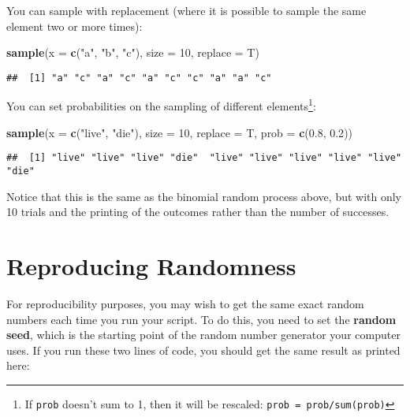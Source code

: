 \documentclass[]{book}
\newenvironment{Shaded}{\begin{snugshade}}{\end{snugshade}}
\newcommand{\DataTypeTok}[1]{\textcolor[rgb]{0.13,0.29,0.53}{#1}}
\newcommand{\DecValTok}[1]{\textcolor[rgb]{0.00,0.00,0.81}{#1}}
\newcommand{\FloatTok}[1]{\textcolor[rgb]{0.00,0.00,0.81}{#1}}
\newcommand{\KeywordTok}[1]{\textcolor[rgb]{0.13,0.29,0.53}{\textbf{#1}}}
\newcommand{\NormalTok}[1]{#1}
\newcommand{\StringTok}[1]{\textcolor[rgb]{0.31,0.60,0.02}{#1}}
\let\rmarkdownfootnote\footnote%
\def\footnote{\protect\rmarkdownfootnote}
\begin{document}
You can sample with replacement (where it is possible to sample the same element two or more times):

\begin{Shaded}
\begin{Highlighting}[]
\KeywordTok{sample}\NormalTok{(}\DataTypeTok{x =} \KeywordTok{c}\NormalTok{(}\StringTok{"a"}\NormalTok{, }\StringTok{"b"}\NormalTok{, }\StringTok{"c"}\NormalTok{), }\DataTypeTok{size =} \DecValTok{10}\NormalTok{, }\DataTypeTok{replace =}\NormalTok{ T)}
\end{Highlighting}
\end{Shaded}

\begin{verbatim}
##  [1] "a" "c" "a" "c" "a" "c" "c" "a" "a" "c"
\end{verbatim}

You can set probabilities on the sampling of different elements\footnote{If \texttt{prob} doesn't sum to 1, then it will be rescaled: \texttt{prob\ =\ prob/sum(prob)}}:

\begin{Shaded}
\begin{Highlighting}[]
\KeywordTok{sample}\NormalTok{(}\DataTypeTok{x =} \KeywordTok{c}\NormalTok{(}\StringTok{"live"}\NormalTok{, }\StringTok{"die"}\NormalTok{), }\DataTypeTok{size =} \DecValTok{10}\NormalTok{, }\DataTypeTok{replace =}\NormalTok{ T,}
       \DataTypeTok{prob =} \KeywordTok{c}\NormalTok{(}\FloatTok{0.8}\NormalTok{, }\FloatTok{0.2}\NormalTok{))}
\end{Highlighting}
\end{Shaded}

\begin{verbatim}
##  [1] "live" "live" "live" "die"  "live" "live" "live" "live" "live" "die"
\end{verbatim}

Notice that this is the same as the binomial random process above, but with only 10 trials and the printing of the outcomes rather than the number of successes.

\hypertarget{reproducing-randomness}{%
\section{Reproducing Randomness}\label{reproducing-randomness}}

For reproducibility purposes, you may wish to get the same exact random numbers each time you run your script. To do this, you need to set the \textbf{random seed}, which is the starting point of the random number generator your computer uses. If you run these two lines of code, you should get the same result as printed here:
\end{document}
